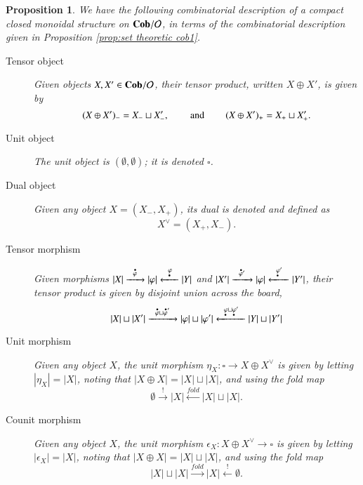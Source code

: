 \documentclass{amsart}
\def\tn{\textnormal}
\def\mc{\mathcal}
\def\hsp{\hspace{.3in}}
\def\to{\rightarrow}
\def\taking{\colon}
\newcommand{\To}[1]{\xrightarrow{#1}}
\newcommand{\Too}[1]{\xrightarrow{\ \ #1\ \ }}
\newcommand{\From}[1]{\xleftarrow{#1}}
\newcommand{\Fromm}[1]{\xleftarrow{\ \ #1\ \ }}
\def\Cob{{\bf Cob}}
\def\mcO{\mc{O}}
\newcommand{\inp}[1]{{#1_-}}
\newcommand{\outp}[1]{{#1_+}}
\newcommand{\domn}[1]{{\accentset{\bullet}{#1}}}
\newcommand{\codomn}[1]{{\underaccent{\bullet}{#1}}}
\newtheorem{proposition}[subsubsection]{Proposition}
\theoremstyle{remark}
\theoremstyle{definition}
\begin{document}
\begin{proposition}

We have the following combinatorial description of a compact closed monoidal structure on $\Cob/\mcO$, in terms of the combinatorial description given in Proposition \ref{prop:set theoretic cob1}.
\begin{description}
\item [Tensor object] Given objects $X,X'\in\Cob/\mcO$, their tensor product, written $X\oplus X'$, is given by 
$$\inp{(X\oplus X')}=\inp{X}\sqcup\inp{X'}, \hsp\tn{and}\hsp \outp{(X\oplus X')}=\outp{X}\sqcup\outp{X'}.$$
\item [Unit object] The unit object is $(\emptyset,\emptyset)$; it is denoted $\square$.
\item [Dual object] Given any object $X=(\inp{X},\outp{X})$, its dual is denoted and defined as 
$$X^\vee=(\outp{X},\inp{X}).$$
\item [Tensor morphism] Given morphisms $|X|\Too{\domn{\varphi}}|\varphi|\Fromm{\codomn{\varphi}}|Y|$ and $|X'|\Too{\domn{\varphi}\hspace{0pt}'}|\varphi|\Fromm{\codomn{\varphi}'}|Y'|$, their tensor product is given by disjoint union across the board,
$$|X|\sqcup|X'|\Too{\domn{\varphi}\sqcup\domn{\varphi}'}|\varphi|\sqcup|\varphi'|\Fromm{\codomn{\varphi}\sqcup\codomn{\varphi}\hspace{0in}'}|Y|\sqcup|Y'|$$
\item [Unit morphism] Given any object $X$, the unit morphism $\eta_X\taking\square\to X\oplus X^\vee$ is given by letting $|\eta_X|=|X|$, noting that $|X\oplus X|=|X|\sqcup|X|$, and using the fold map 
$$\emptyset\To{!}|X|\From{fold}|X|\sqcup|X|.$$
\item [Counit morphism] Given any object $X$, the unit morphism $\epsilon_X\taking X\oplus X^\vee\to\square$ is given by letting $|\epsilon_X|=|X|$, noting that $|X\oplus X|=|X|\sqcup|X|$, and using the fold map 
$$|X|\sqcup|X|\To{fold}|X|\From{!}\emptyset.$$

\end{description}

\end{proposition}
\end{document}
